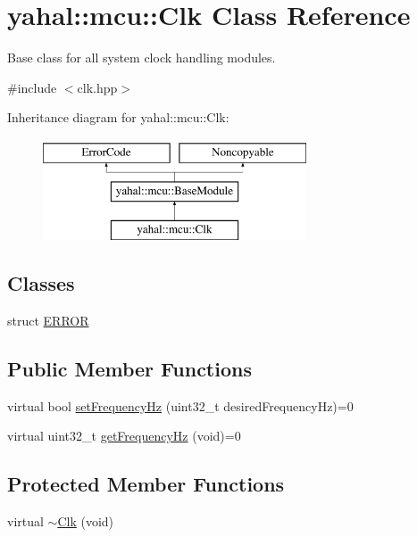 \hypertarget{classyahal_1_1mcu_1_1_clk}{}\section{yahal\+:\+:mcu\+:\+:Clk Class Reference}
\label{classyahal_1_1mcu_1_1_clk}


Base class for all system clock handling modules.  




{\ttfamily \#include $<$clk.\+hpp$>$}

Inheritance diagram for yahal\+:\+:mcu\+:\+:Clk\+:\begin{figure}[H]
\begin{center}
\leavevmode
\includegraphics[height=3.000000cm]{classyahal_1_1mcu_1_1_clk}
\end{center}
\end{figure}
\subsection*{Classes}
\begin{DoxyCompactItemize}
\item 
struct \hyperlink{structyahal_1_1mcu_1_1_clk_1_1_e_r_r_o_r}{E\+R\+R\+O\+R}
\end{DoxyCompactItemize}
\subsection*{Public Member Functions}
\begin{DoxyCompactItemize}
\item 
virtual bool \hyperlink{classyahal_1_1mcu_1_1_clk_a6623c951307778c2e48a096bb5c4804a}{set\+Frequency\+Hz} (uint32\+\_\+t desired\+Frequency\+Hz)=0
\item 
virtual uint32\+\_\+t \hyperlink{classyahal_1_1mcu_1_1_clk_a402906c8635bdbf999d4b13895e42ff2}{get\+Frequency\+Hz} (void)=0
\end{DoxyCompactItemize}
\subsection*{Protected Member Functions}
\begin{DoxyCompactItemize}
\item 
virtual \hyperlink{classyahal_1_1mcu_1_1_clk_ab6a9b356f341d87053de084acf0021c3}{$\sim$\+Clk} (void)
\end{DoxyCompactItemize}


